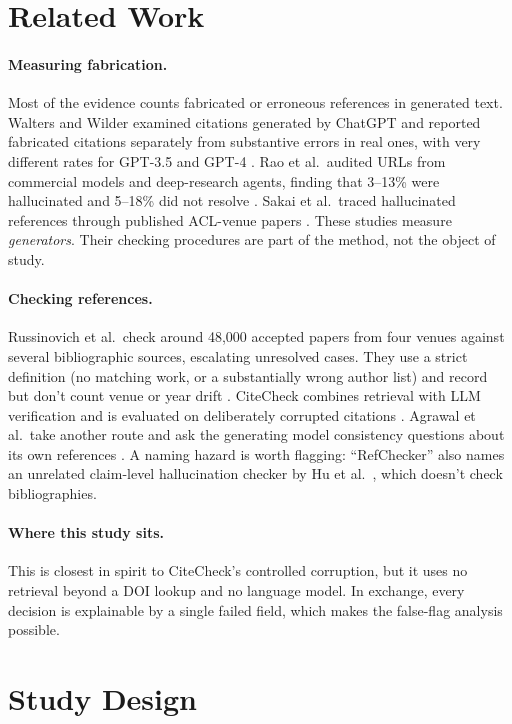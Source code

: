 \documentclass[acmsmall,screen,nonacm]{acmart}
\begin{document}
\section{Related Work}
\paragraph{Measuring fabrication.} Most of the evidence counts fabricated or erroneous references in generated text. Walters and Wilder examined citations generated by ChatGPT and reported fabricated citations separately from substantive errors in real ones, with very different rates for GPT-3.5 and GPT-4 \citep{walters2023}. Rao et al.\ audited URLs from commercial models and deep-research agents, finding that 3--13\% were hallucinated and 5--18\% did not resolve \citep{rao2026}. Sakai et al.\ traced hallucinated references through published ACL-venue papers \citep{sakai2026}. These studies measure \emph{generators}. Their checking procedures are part of the method, not the object of study.

\paragraph{Checking references.} Russinovich et al.\ check around 48{,}000 accepted papers from four venues against several bibliographic sources, escalating unresolved cases. They use a strict definition (no matching work, or a substantially wrong author list) and record but don't count venue or year drift \citep{russinovich2026}. CiteCheck combines retrieval with LLM verification and is evaluated on deliberately corrupted citations \citep{khajavi2026citecheck}. Agrawal et al.\ take another route and ask the generating model consistency questions about its own references \citep{agrawal2024}. A naming hazard is worth flagging: ``RefChecker'' also names an unrelated claim-level hallucination checker by Hu et al.\ \citep{hu2024refchecker}, which doesn't check bibliographies.

\paragraph{Where this study sits.} This is closest in spirit to CiteCheck's controlled corruption, but it uses no retrieval beyond a DOI lookup and no language model. In exchange, every decision is explainable by a single failed field, which makes the false-flag analysis possible.

\section{Study Design}
\end{document}
